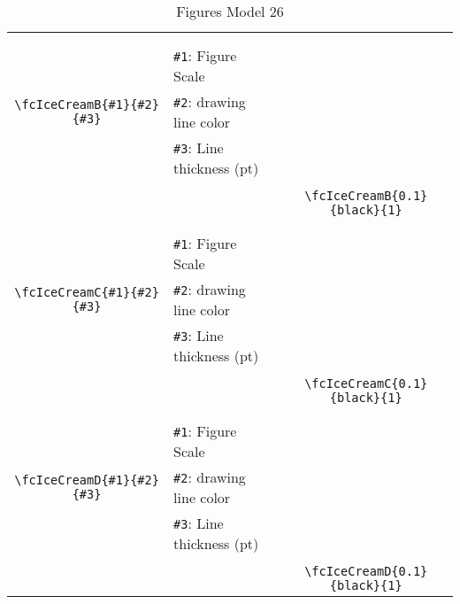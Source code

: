 \documentclass[x11names]{article}
\begin{document}
\begin{table}[H]
\begin{tabular}{|c|l|c|}
	&&\multirow{5}{*}{\fcIceCreamB{0.1}{black}{1}}\\	&&\\	&\verb|#1|: Figure Scale &\\	\verb|\fcIceCreamB{#1}{#2}{#3}|&	\verb|#2|: drawing line color &\\	&\verb|#3|: Line thickness (pt) &\\ &&\\&&	\verb|\fcIceCreamB{0.1}{black}{1}|\\\hline 	
	&&\multirow{5}{*}{\fcIceCreamC{0.1}{black}{1}}\\	&&\\	&\verb|#1|: Figure Scale &\\	\verb|\fcIceCreamC{#1}{#2}{#3}|&	\verb|#2|: drawing line color &\\	&\verb|#3|: Line thickness (pt) &\\ &&\\&&	\verb|\fcIceCreamC{0.1}{black}{1}|\\\hline 	
	&&\multirow{5}{*}{\fcIceCreamD{0.1}{black}{1}}\\	&&\\	&\verb|#1|: Figure Scale &\\	\verb|\fcIceCreamD{#1}{#2}{#3}|&	\verb|#2|: drawing line color &\\	&\verb|#3|: Line thickness (pt) &\\ &&\\&&	\verb|\fcIceCreamD{0.1}{black}{1}|\\\hline 	\hline\end{tabular}\caption{Figures Model 26}\label{tab26}\end{table}
\end{document}
